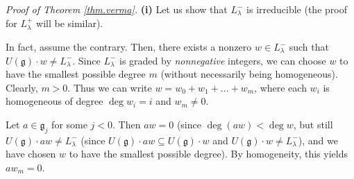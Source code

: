\documentclass
[numbers=enddot,12pt,final,onecolumn,german,notitlepage]{scrartcl}%
\theoremstyle{definition}
\begin{document}
\textit{Proof of Theorem \ref{thm.verma}.} \textbf{(i)} Let us show that
$L_{\lambda}^{-}$ is irreducible (the proof for $L_{\lambda}^{+}$ will be similar).

In fact, assume the contrary. Then, there exists a nonzero $w\in L_{\lambda
}^{-}$ such that $U\left(  \mathfrak{g}\right)  \cdot w\neq L_{\lambda}^{-}$.
Since $L_{\lambda}^{-}$ is graded by \textit{nonnegative} integers, we can
choose $w$ to have the smallest possible degree $m$ (without necessarily being
homogeneous). Clearly, $m>0$. Thus we can write $w=w_{0}+w_{1}+...+w_{m}$,
where each $w_{i}$ is homogeneous of degree $\deg w_{i}=i$ and $w_{m}\neq0$.

Let $a\in\mathfrak{g}_{j}$ for some $j<0$. Then $aw=0$ (since $\deg\left(
aw\right)  <\deg w$, but still $U\left(  \mathfrak{g}\right)  \cdot aw\neq
L_{\lambda}^{-}$ (since $U\left(  \mathfrak{g}\right)  \cdot aw\subseteq
U\left(  \mathfrak{g}\right)  \cdot w$ and $U\left(  \mathfrak{g}\right)
\cdot w\neq L_{\lambda}^{-}$), and we have chosen $w$ to have the smallest
possible degree). By homogeneity, this yields $aw_{m}=0$.
\end{document}
